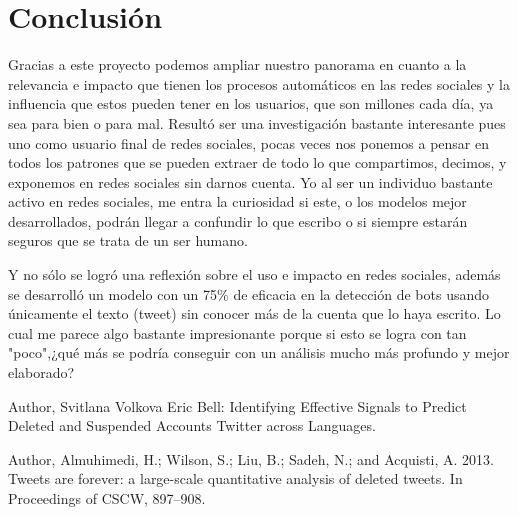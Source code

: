 \documentclass[runningheads]{llncs}
\begin{document}
\section{Conclusión}
Gracias a este proyecto podemos ampliar nuestro panorama en cuanto a la relevancia e impacto que tienen los procesos automáticos en las redes sociales y la influencia que estos pueden tener en los usuarios, que son millones cada día, ya sea para bien o para mal. Resultó ser una investigación bastante interesante pues uno como usuario final de redes sociales, pocas veces nos ponemos a pensar en todos los patrones que se pueden extraer de todo lo que compartimos, decimos, y exponemos en redes sociales sin darnos cuenta. Yo al ser un individuo bastante activo en redes sociales, me entra la curiosidad si este, o los modelos mejor desarrollados, podrán llegar a confundir lo que escribo o si siempre estarán seguros que se trata de un ser humano. 

Y no sólo se logró una reflexión sobre el uso e impacto en redes sociales, además se desarrolló un modelo con un 75\% de eficacia en la detección de bots usando únicamente el texto (tweet) sin conocer más de la cuenta que lo haya escrito. Lo cual me parece algo bastante impresionante porque si esto se logra con tan "poco",¿qué más se podría conseguir con un análisis mucho más profundo y mejor elaborado? 

%
%
%
% 
% 
%
\begin{thebibliography}{8}
Author, Svitlana Volkova Eric Bell: Identifying Effective Signals to Predict Deleted and Suspended Accounts Twitter across Languages. 

Author, Almuhimedi, H.; Wilson, S.; Liu, B.; Sadeh, N.; and Acquisti,
A. 2013. Tweets are forever: a large-scale quantitative
analysis of deleted tweets. In Proceedings of CSCW,
897–908.

\end{thebibliography}
\end{document}
